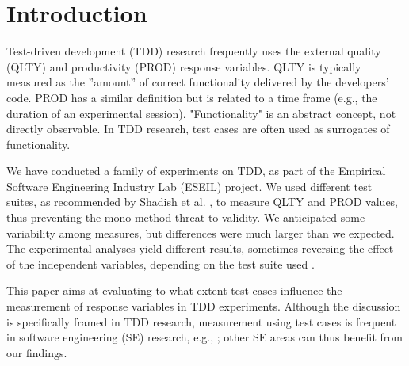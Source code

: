 \section{Introduction}\label{sec:introduction}

Test-driven development (TDD) research frequently uses the external quality (QLTY) and productivity (PROD) response variables. QLTY is typically measured as the ''amount'' of correct functionality delivered by the developers' code. PROD has a similar definition but is related to a time frame (e.g., the duration of an experimental session). "Functionality" is an abstract concept, not directly observable. In TDD research, test cases are often used as surrogates of functionality.

We have conducted a family of experiments on TDD, as part of the Empirical Software Engineering Industry Lab (ESEIL) project. We used different test suites, as recommended by Shadish et al. \cite[81-82]{Shadish2002}, to measure QLTY and PROD values, thus preventing the mono-method threat to validity. We anticipated some variability among measures, but differences were much larger than we expected. The experimental analyses yield different results, sometimes reversing the effect of the independent variables, depending on the test suite used \cite{Elizabeth2015}.

This paper aims at evaluating to what extent test cases influence the measurement of response variables in TDD experiments. Although the discussion is specifically framed in TDD research, measurement using test cases is frequent in software engineering (SE) research, e.g., \cite{kieburtz1996software,knight1986experimental,feldt1998generating}; other SE areas can thus benefit from our findings. 

